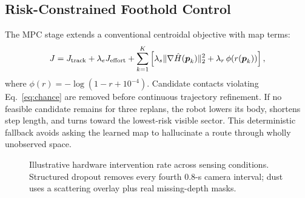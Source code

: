 \subsection{Risk-Constrained Foothold Control}

The MPC stage extends a conventional centroidal objective with map terms:
\begin{equation}
 J=J_{\mathrm{track}}+\lambda_eJ_{\mathrm{effort}}
 +\sum_{k=1}^{K}\left[
 \lambda_s\lVert\nabla\hat H(\boldsymbol{p}_k)\rVert_2^2
 +\lambda_r\,\phi(r(\boldsymbol{p}_k))\right],
 \label{eq:objective}
\end{equation}
where $\phi(r)=-\log(1-r+10^{-4})$. Candidate contacts violating
Eq.~\eqref{eq:chance} are removed before continuous trajectory refinement. If no feasible
candidate remains for three replans, the robot lowers its body, shortens step length, and
turns toward the lowest-risk visible sector. This deterministic fallback avoids asking the
learned map to hallucinate a route through wholly unobserved space.

\begin{figure}[t]
\centering
{}
\caption{Illustrative hardware intervention rate across sensing conditions. Structured
dropout removes every fourth 0.8-s camera interval; dust uses a scattering overlay plus
real missing-depth masks.}
\label{fig:interventions}
\end{figure}
